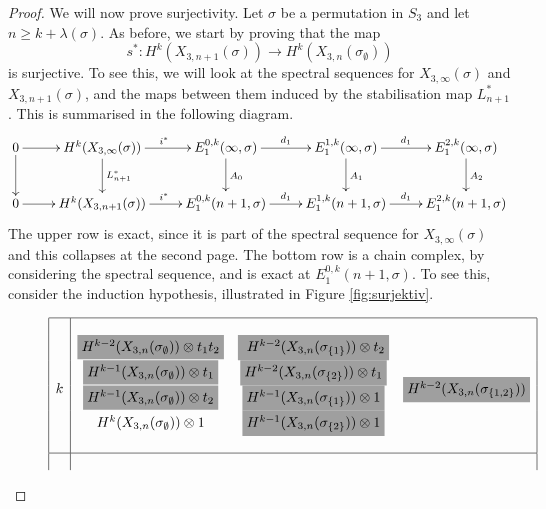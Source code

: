 \begin{proof}
We will now prove surjectivity. Let $\sigma$ be a permutation in $S_3$
and let $n \geq k + \lambda(\sigma)$. As before, we start by proving
that the map
\[ s^* : H^k(X_{3,n+1}(\sigma)) \to
H^k(X_{3,n}(\sigma_{\emptyset})) \] 
is surjective. To see this, we will look at the spectral sequences for
$X_{3,\infty}(\sigma)$ and $X_{3,n+1}(\sigma)$, and the maps between
them induced by the stabilisation map $L^*_{n+1}$. This is summarised in
the following diagram. 
\[ \xymatrix{ 0 \ar[r]\ar[d] & H^k(X_{3,\infty}(\sigma))
  \ar[r]^{i^*}\ar[d]^{L^*_{n+1}} & E_1^{0,k}(\infty,\sigma)
  \ar[r]^{d_1}\ar[d]^{A_0} & 
  E_1^{1,k}(\infty,\sigma) \ar[r]^{d_1}\ar[d]^{A_1} &
  E_1^{2,k}(\infty,\sigma) \ar[d]^{A_2} \\
  0 \ar[r] & H^k(X_{3,n+1}(\sigma)) \ar[r]^{i^*} &
  E_1^{0,k}(n+1,\sigma) \ar[r]^{d_1} & E_1^{1,k}(n+1,\sigma)
  \ar[r]^{d_1} & E_1^{2,k}(n+1,\sigma) 
} \]
The upper row is exact, since it is part of the spectral sequence for
$X_{3,\infty}(\sigma)$ and this collapses at the second page. The
bottom row is a chain complex, by considering the spectral sequence,
and is exact at
$E_1^{0,k}(n+1,\sigma)$. To see this, consider the induction
hypothesis, illustrated in Figure \ref{fig:surjektiv}.
\begin{figure}[ht]
  \[ 
  \begin{array}{|c|ccc|}
    \hline 
    &
    &
    &
    \\
    \multirow{6}{*}{$k$} 
    & \colorbox{isomorphism}{$H^{k-2}(X_{3,n}(\sigma_{\emptyset}))
      \otimes t_1t_2 $}
    & \colorbox{isomorphism}{ $H^{k-2}(X_{3,n}(\sigma_{\set{1}}))
      \otimes t_2 $}
    & \multirow{6}{*}{\colorbox{isomorphism}{$
      H^{k-2}(X_{3,n}(\sigma_{\set{1,2}}))$}} \\
    & \colorbox{isomorphism}{$H^{k-1}(X_{3,n}(\sigma_{\emptyset}))
      \otimes t_1$}
    & \colorbox{isomorphism}{$H^{k-2}(X_{3,n}(\sigma_{\set{2}}))
      \otimes t_1$}
    & \\
    & \colorbox{isomorphism}{$H^{k-1}(X_{3,n}(\sigma_{\emptyset}))
      \otimes t_2 $} 
    & \colorbox{isomorphism}{$H^{k-1}(X_{3,n}(\sigma_{\set{1}}))
      \otimes 1$} &\\
    & H^k(X_{3,n}(\sigma_{\emptyset})) \otimes 1 
    & \colorbox{isomorphism}{$H^{k-1}(X_{3,n}(\sigma_{\set{2}}))
      \otimes 1$} &\\
    & & &\\
    \hline& & & \\

\end{array}\]
\end{figure}
\end{proof}

